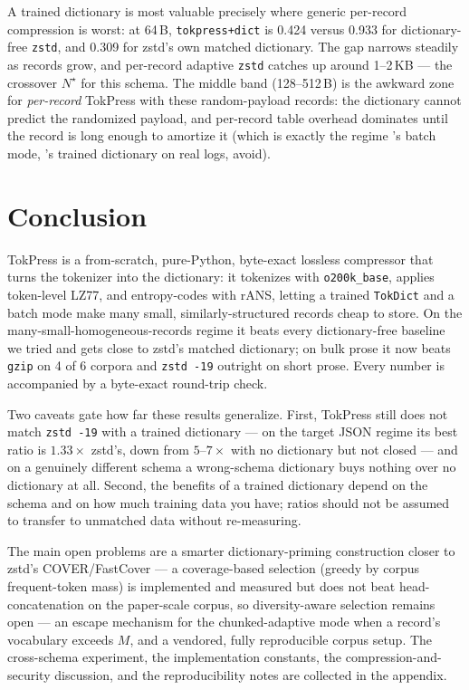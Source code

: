 \documentclass[10pt,twocolumn]{article}
\theoremstyle{plain}
\theoremstyle{definition}
\begin{document}
A trained dictionary is most valuable precisely where generic per-record compression is
worst: at 64\,B, \texttt{tokpress+dict} is 0.424 versus 0.933 for dictionary-free
\texttt{zstd}, and 0.309 for zstd's own matched dictionary. The gap narrows steadily
as records grow, and per-record adaptive \texttt{zstd} catches up around 1--2\,KB ---
the crossover $N^\star$ for this schema. The middle band (128--512\,B) is the awkward
zone for \emph{per-record} TokPress with these random-payload records: the dictionary
cannot predict the randomized payload, and per-record table overhead dominates until
the record is long enough to amortize it (which is exactly the regime
's batch mode, 's trained dictionary on real logs,
avoid).


\section{Conclusion}\label{sec:conclusion}\label{sec:limits}

TokPress is a from-scratch, pure-Python, byte-exact lossless compressor that turns the
tokenizer into the dictionary: it tokenizes with \texttt{o200k\_base}, applies
token-level LZ77, and entropy-codes with rANS, letting a trained \texttt{TokDict} and a
batch mode make many small, similarly-structured records cheap to store. On the
many-small-homogeneous-records regime it beats every dictionary-free baseline we tried
and gets close to zstd's matched dictionary; on bulk prose it now beats \texttt{gzip}
on 4 of 6 corpora and \texttt{zstd -19} outright on short prose. Every number is
accompanied by a byte-exact round-trip check.

Two caveats gate how far these results generalize. First, TokPress still does not match
\texttt{zstd -19} with a trained dictionary --- on the target JSON regime its best
ratio is $1.33\times$ zstd's, down from $5$--$7\times$ with no dictionary but not
closed --- and on a genuinely different schema a wrong-schema dictionary buys nothing
over no dictionary at all. Second, the benefits of a trained dictionary depend on the
schema and on how much training data you have; ratios should not be assumed to transfer
to unmatched data without re-measuring.

The main open problems are a smarter dictionary-priming construction closer to zstd's
COVER/FastCover --- a coverage-based selection (greedy by corpus frequent-token mass)
is implemented and measured but does not beat head-concatenation on the paper-scale
corpus, so diversity-aware selection remains open --- an escape mechanism for the
chunked-adaptive mode when a record's
vocabulary exceeds $M$, and a vendored, fully reproducible corpus setup. The
cross-schema experiment, the implementation constants, the compression-and-security
discussion, and the reproducibility notes are collected in the appendix.
\end{document}
